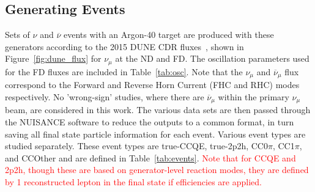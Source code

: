 \documentclass[12pt]{article}
\begin{document}
\subsection{Generating Events}
\label{subsec:events}
Sets of $\nu$ and $\overline{\nu}$ events with an Argon-40 target are produced with these generators according to the 2015 DUNE CDR fluxes~\cite{DUNE_osc}, shown in Figure~\ref{fig:dune_flux} for $\nu_{\mu}$ at the ND and FD. The oscillation parameters used for the FD fluxes are included in Table~\ref{tab:osc}. Note that the $\nu_\mu$ and $\overline{\nu}_\mu$ flux correspond to the Forward and Reverse Horn Current (FHC and RHC) modes respectively. No 'wrong-sign' studies, where there are $\overline{\nu}_\mu$ within the primary $\nu_\mu$ beam, are considered in this work. The various data sets are then passed through the NUISANCE\cite{NUISANCE} software to reduce the outputs to a common format, in turn saving all final state particle information for each event. Various event types are studied separately. These event types are true-CCQE, true-2p2h, CC0$\pi$, CC1$\pi$, and CCOther and are defined in Table~\ref{tab:events}. \textcolor{red}{Note that for CCQE and 2p2h, though these are based on generator-level reaction modes, they are defined by 1 reconstructed lepton in the final state if  efficiencies are applied.}
\end{document}
